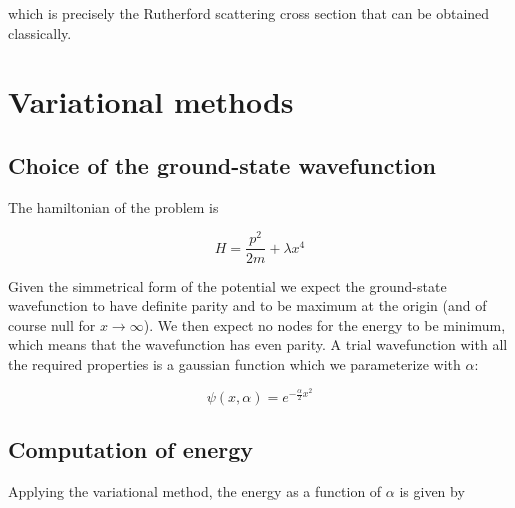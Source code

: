 \documentclass{article}
\begin{document}
which is precisely the Rutherford scattering cross section that can be obtained classically.

\section{Variational methods}

\subsection{Choice of the ground-state wavefunction}
The hamiltonian of the problem is

\begin{equation}
H = \frac{p^2}{2m} + \lambda x^4
\end{equation}

Given the simmetrical form of the potential we expect the ground-state wavefunction to have definite parity and to be maximum at the origin (and of course null for \( x \rightarrow \infty \)). We then expect no nodes for the energy to be minimum, which means that the wavefunction has even parity. A trial wavefunction with all the required properties is a gaussian function which we parameterize with \(\alpha\):

\begin{equation}
\psi(x,\alpha) = e^{-\frac{\alpha}{2}x^2}
\end{equation}

\subsection{Computation of energy}
Applying the variational method, the energy as a function of \(\alpha\) is given by
\end{document}
